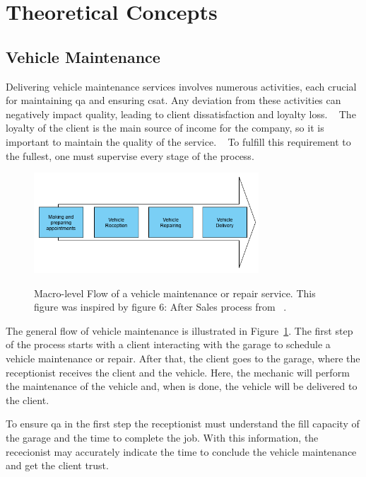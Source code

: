 \section{Theoretical Concepts}

\subsection{Vehicle Maintenance}

Delivering vehicle maintenance services involves numerous activities, each crucial for maintaining \acs{qa} and ensuring \acs{csat}. 
Any deviation from these activities can negatively impact quality, leading to client dissatisfaction and loyalty loss. ~\cite{Setting_the_after_sale_process, Famiyeh_2018, Akuntansi_2022} 
The loyalty of the client is the main source of income for the company, so it is important to maintain the quality of the service. ~\cite{Setting_the_after_sale_process}
To fulfill this requirement to the fullest, one must supervise every stage of the process. ~\cite{Setting_the_after_sale_process}


\begin{figure}[h]
  \caption{Macro-level Flow of a vehicle maintenance or repair service. This figure was inspired by figure 6: After Sales process from ~\citet{Setting_the_after_sale_process}.}
  \centering
  \includegraphics[width=0.75\textwidth]{figs/Vehicle_maintenace_macro}
  \label{fig:Vehicle_maintenace_macro}
\end{figure}

The general flow of vehicle maintenance is illustrated in Figure~\ref{fig:Vehicle_maintenace_macro}. 
The first step of the process starts with a client interacting with the garage to schedule a vehicle maintenance or repair. 
After that, the client goes to the garage, where the receptionist receives the client and the vehicle.
Here, the mechanic will perform the maintenance of the vehicle and, when is done, the vehicle will be delivered to the client.

To ensure \acs{qa} in the first step the receptionist must understand the fill capacity of the garage and the time to complete the job. 
With this information, the rececionist may accurately indicate the time to conclude the vehicle maintenance and get the client trust. ~\cite{Setting_the_after_sale_process}

